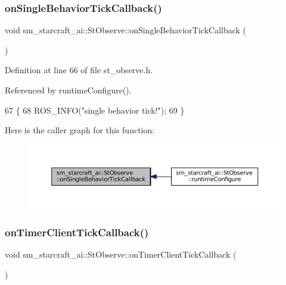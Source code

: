 \subsubsection{\texorpdfstring{on\+Single\+Behavior\+Tick\+Callback()}{onSingleBehaviorTickCallback()}}
{\footnotesize\ttfamily void sm\+\_\+starcraft\+\_\+ai\+::\+St\+Observe\+::on\+Single\+Behavior\+Tick\+Callback (\begin{DoxyParamCaption}{ }\end{DoxyParamCaption})\hspace{0.3cm}{\ttfamily [inline]}}



Definition at line 66 of file st\+\_\+observe.\+h.



Referenced by runtime\+Configure().


\begin{DoxyCode}
67     \{
68         ROS\_INFO(\textcolor{stringliteral}{"single behavior tick!"});
69     \}
\end{DoxyCode}
Here is the caller graph for this function\+:
\nopagebreak
\begin{figure}[H]
\begin{center}
\leavevmode
\includegraphics[width=350pt]{structsm__starcraft__ai_1_1StObserve_ad546305bf7c7f7e730bbeb5cf320930d_icgraph}
\end{center}
\end{figure}
\mbox{\label{structsm__starcraft__ai_1_1StObserve_acb92d67845c27aead231cbf52b13e9c8}} 
\subsubsection{\texorpdfstring{on\+Timer\+Client\+Tick\+Callback()}{onTimerClientTickCallback()}}
{\footnotesize\ttfamily void sm\+\_\+starcraft\+\_\+ai\+::\+St\+Observe\+::on\+Timer\+Client\+Tick\+Callback (\begin{DoxyParamCaption}{ }\end{DoxyParamCaption})\hspace{0.3cm}{\ttfamily [inline]}}



